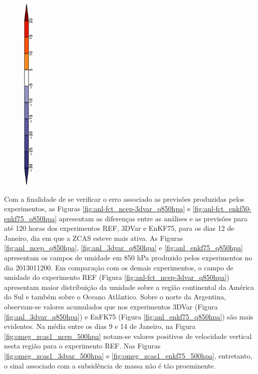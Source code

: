 \begin{figure}[H]
\begin{center}
{        }\\
        \includegraphics[width=0.04\textwidth,angle=-90]{./figs/cap5/estudo_zcas/cbar/cbar_omeg-crop.pdf}
    \end{center}
    \vspace{2mm}    
    \legenda{}
    \label{fig:omeg_zcas1_500hpa}
\end{figure}

Com a finalidade de se verificar o erro associado as previsões produzidas pelos experimentos, as Figuras \ref{fig:anl-fct_ncep-3dvar_q850hpa} e \ref{fig:anl-fct_enkf50-enkf75_q850hpa} apresentam as diferenças entre as análises e as previsões para até 120 horas dos experimentos REF, 3DVar e EnKF75, para os dias 12 de Janeiro, dia em que a ZCAS esteve mais ativa. As Figuras \ref{fig:anl_ncep_q850hpa}, \ref{fig:anl_3dvar_q850hpa} e \ref{fig:anl_enkf75_q850hpa} apresentam os campos de umidade em 850 hPa produzido pelos experimentos no dia 2013011200. Em comparação com os demais experimentos, o campo de umidade do experimento REF (Figura \ref{fig:anl-fct_ncep-3dvar_q850hpa}) apresentam maior distribuição da umidade sobre a região continental da América do Sul e também sobre o Oceano Atlântico. Sobre o norte da Argentina, observam-se valores acumulados que nos experimentos 3DVar (Figura \ref{fig:anl_3dvar_q850hpa}) e EnFK75 (Figura \ref{fig:anl_enkf75_q850hpa}) são mais evidentes. Na média entre os dias 9 e 14 de Janeiro, na Figura \ref{fig:omeg_zcas1_ncep_500hpa} notam-se valores positivos de velocidade vertical nesta região para o experimento REF. Nas Figuras \ref{fig:omeg_zcas1_3dvar_500hpa} e \ref{fig:omeg_zcas1_enkf75_500hpa}, entretanto, o sinal associado com a subsidência de massa não é tão proeminente.

